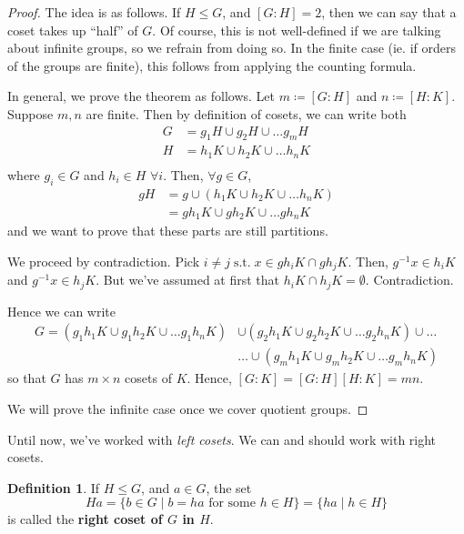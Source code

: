 \documentclass[11pt]{amsart} %
\theoremstyle{definition}
\newtheorem{definition}{Definition}[section]
\theoremstyle{definition}
\DeclareMathOperator{\suchthat}{\text{ s.t. }}
\numberwithin{equation}{section}
\begin{document}
\begin{proof}
	The idea is as follows. If $H \leq G$, and $[G:H]=2$, then we can say that a coset takes up ``half'' of $G$. Of course, this is not well-defined if we are talking about infinite groups, so we refrain from doing so. In the finite case (ie. if orders of the groups are finite), this follows from applying the counting formula.
	
	In general, we prove the theorem as follows. Let $m \coloneqq [G:H]$ and $n \coloneqq [H:K]$. Suppose $m, n$ are finite. Then by definition of cosets, we can write both
	$$ \begin{aligned}
	G &= g_1 H \cup g_2 H \cup \dots g_m H \\
	H &= h_1 K \cup h_2 K \cup \dots h_n K \\	
	\end{aligned} $$
	where $g_i \in G $ and $h_i \in H$ $\forall i$. Then, $\forall g \in G$,
	$$ \begin{aligned}
	gH &= g \cup ( h_1 K \cup h_2 K \cup \dots h_n K  ) \\
	&= g h_1 K \cup g h_2 K \cup \dots g h_n K 
	\end{aligned} $$
	and we want to prove that these parts are still partitions.
	
	We proceed by contradiction. Pick $i \neq j \suchthat x \in g h_i K \cap g h_j K$. Then, $ g^{-1} x \in h_i K$ and $ g^{-1} x \in h_j K$. But we've assumed at first that $h_i K \cap h_j K = \emptyset$. Contradiction.
	
	Hence we can write
	$$\begin{aligned}
	G = ( g_1 h_1 K \cup g_1 h_2 K \cup \dots g_1 h_n K   ) &\cup ( g_2 h_1 K \cup g_2 h_2 K \cup \dots g_2 h_n K   ) \cup \dots \\
	& \dots \cup ( g_m h_1 K \cup g_m h_2 K \cup \dots g_m h_n K   )
	\end{aligned} $$
	so that $G$ has $m \times n$ cosets of $K$. Hence, $[G:K] = [G:H] [H:K] = mn$.
	
	We will prove the infinite case once we cover quotient groups.
\end{proof}

Until now, we've worked with \textit{left cosets}. We can and should work with right cosets.

\begin{definition}
	If $H \leq G$, and $a \in G$, the set 
	$$Ha = \{ b \in G \mid b = ha \text{ for some } h \in H \} = \{  ha \mid h \in H \} $$
	is called the \textbf{right coset of $G$ in $H$}.
\end{definition}
\end{document}
